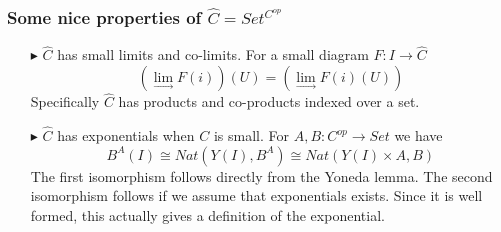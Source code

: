 \documentclass[10.5pt,compress]{beamer}
\begin{document}
\begin{frame}\label{frame : properties of C hat}
\frametitle{Some nice properties of $\widehat{C} = Set^{C^{op}}$}

\begin{enumerate}

\item[$\blacktriangleright$]
$\widehat{C}$ has small limits and co-limits. For a small diagram $F : I \to \widehat{C}$ 
\textcolor{beamer@mathtext}{
\[ (\lim_{\to} F(i))(U) = (\lim_{\to}F(i)(U)) \]
}
Specifically $\widehat{C}$ has products and co-products indexed over a set.

\item[$\blacktriangleright$]
$\widehat{C}$ has exponentials when $C$ is small. For $A, B : C^{op} \to Set$ we have
\textcolor{beamer@mathtext}{
\[ B^A(I) \cong Nat(Y(I), B^A) \cong Nat(Y(I) \times A, B) \]
}
The first isomorphism follows directly from the Yoneda lemma.
The second isomorphism follows if we assume that exponentials exists. 
Since it is well formed, this actually gives a definition of the exponential.

\end{enumerate}

\end{frame}

\end{document}
